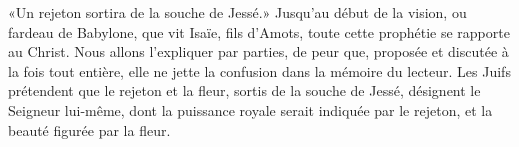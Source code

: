 «Un rejeton sortira de la souche de Jessé.»
Jusqu’au début de la vision, ou fardeau de Babylone,
	que vit Isaïe, fils d’Amots,
	toute cette prophétie se rapporte au Christ.
Nous allons l’expliquer par parties,
	de peur que, proposée et discutée à la fois tout entière,
	elle ne jette la confusion dans la mémoire du lecteur.
Les Juifs prétendent que le rejeton et la fleur, sortis de la souche de Jessé,
	désignent le Seigneur lui-même,
	dont la puissance royale serait indiquée par le rejeton,
	et la beauté figurée par la fleur.
